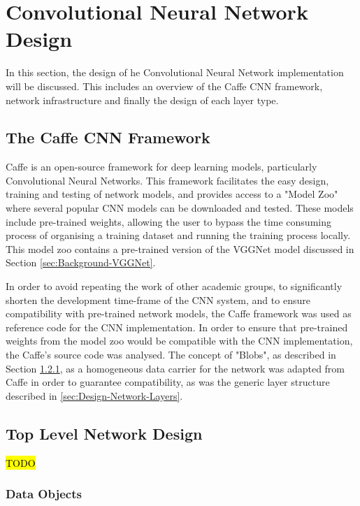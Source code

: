\documentclass[12pt]{article}
\begin{document}
\section{Convolutional Neural Network Design}
\label{sec:Design-CNNS}

In this section, the design of he Convolutional Neural Network implementation will be discussed. This includes an overview of the Caffe CNN framework, network infrastructure and finally the design of each layer type.

\subsection{The Caffe CNN Framework}
\label{sec:Design-Network-Caffe}

Caffe is an open-source framework for deep learning models, particularly Convolutional Neural Networks. This framework facilitates the easy design, training and testing of network models, and provides access to a "Model Zoo" where several popular CNN models can be downloaded and tested\cite{caffe}. These models include pre-trained weights, allowing the user to bypass the time consuming process of organising a training dataset and running the training process locally. This model zoo contains a pre-trained version of the VGGNet model discussed in Section \ref{sec:Background-VGGNet}.

In order to avoid repeating the work of other academic groups, to significantly shorten the  development time-frame of the CNN system, and to ensure compatibility with pre-trained network models, the Caffe framework was used as reference code for the CNN implementation. In order to ensure that pre-trained weights from the model zoo would be compatible with the CNN implementation, the Caffe's source code was analysed. The concept of "Blobs", as described in Section \ref{sec:Design-Network-Blobs}, as a homogeneous data carrier for the network was adapted from Caffe in order to guarantee compatibility, as was the generic layer structure described in \ref{sec:Design-Network-Layers}.

\subsection{Top Level Network Design}
\label{sec:Design-Network}

\hl{TODO}

\subsubsection{Data Objects}
\label{sec:Design-Network-Blobs}
\end{document}
